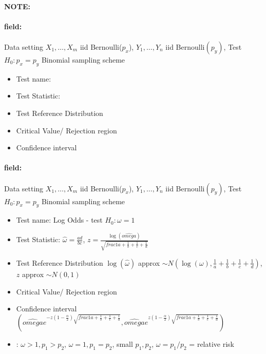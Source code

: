 \documentclass[12pt]{article}
\newenvironment{note}{\paragraph{NOTE:}}{}
\newenvironment{field}{\paragraph{field:}}{}
\begin{document}
\begin{note}
 \begin{field}
  Data setting $X_1, \ldots , X_m$ iid Bernoulli($p_x$), $Y_1, \ldots, Y_n$ iid Bernoulli$(p_y)$, Test $H_0: p_x = p_y $ Binomial sampling scheme
  \begin{itemize}
   \item Test name:
   \item Test Statistic:
   \item Test Reference Distribution
   \item Critical Value/ Rejection region
   \item Confidence interval
  \end{itemize}
 \end{field}
 \begin{field}
  Data setting $X_1, \ldots , X_m$ iid Bernoulli($p_x$), $Y_1, \ldots, Y_n$ iid Bernoulli$(p_y)$, Test $H_0: p_x = p_y $ Binomial sampling scheme
  \begin{itemize}
   \item Test name: Log Odds - test $H_0: \omega = 1$
   \item Test Statistic: $\hat{\omega} = \frac{ad}{bc}$, $z = \frac{\log(\hat{omega})}{\sqrt{frac{1}{a} + \frac{1}{b} + \frac{1}{c} + \frac{1}{d}}}$
   \item Test Reference Distribution $ \log(\hat{\omega}) $ approx $\sim N(\log(\omega), \frac{1}{a} + \frac{1}{b} + \frac{1}{c} + \frac{1}{d})$, $z $ approx $\sim N(0,1)$
   \item Critical Value/ Rejection region
   \item Confidence interval $(\hat{omega}e^{-z(1 - \frac{\alpha}{2})\sqrt{frac{1}{a} + \frac{1}{b} + \frac{1}{c} + \frac{1}{d}}}, \hat{omega}e^{z(1 - \frac{\alpha}{2})\sqrt{frac{1}{a} + \frac{1}{b} + \frac{1}{c} + \frac{1}{d}}})$
   \item: $\omega > 1, p_1 > p_2$, $\omega = 1, p_1 = p_2$, small $p_1, p_2$, $\omega = p_1/p_2$ = relative risk
  \end{itemize}
 \end{field}
\end{note}
\end{document}
